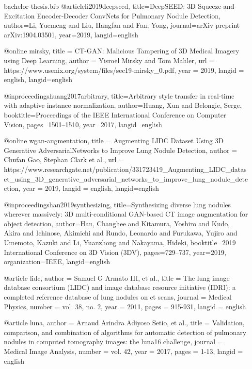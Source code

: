 
\begin{filecontents}{bachelor-thesis.bib}
@article{li2019deepseed,
  title={DeepSEED: 3D Squeeze-and-Excitation Encoder-Decoder ConvNets for Pulmonary Nodule Detection},
  author={Li, Yuemeng and Liu, Hangfan and Fan, Yong},
  journal={arXiv preprint arXiv:1904.03501},
  year={2019},
  langid={english}
}

@online{ mirsky,
    title       = {CT-GAN: Malicious Tampering of 3D Medical Imagery using Deep Learning},
    author      = {Yisroel Mirsky and Tom Mahler},
    url         = {https://www.usenix.org/system/files/sec19-mirsky_0.pdf},
    year        = {2019},
    langid      = {english},
    langid={english}
}

@inproceedings{huang2017arbitrary,
  title={Arbitrary style transfer in real-time with adaptive instance normalization},
  author={Huang, Xun and Belongie, Serge},
  booktitle={Proceedings of the IEEE International Conference on Computer Vision},
  pages={1501--1510},
  year={2017},
  langid={english}
}


@online{ wgan-augmentation,
    title       = {Augmenting LIDC Dataset Using 3D Generative AdversarialNetworks to Improve Lung Nodule Detection},
    author      = {Chufan Gao, Stephan Clark et al.},
    url         = {https://www.researchgate.net/publication/331723419_Augmenting_LIDC_dataset_using_3D_generative_adversarial_networks_to_improve_lung_nodule_detection},
    year        = {2019},
    langid      = {english},
    langid={english}
}

@inproceedings{han2019synthesizing,
  title={Synthesizing diverse lung nodules wherever massively: 3D multi-conditional GAN-based CT image augmentation for object detection},
  author={Han, Changhee and Kitamura, Yoshiro and Kudo, Akira and Ichinose, Akimichi and Rundo, Leonardo and Furukawa, Yujiro and Umemoto, Kazuki and Li, Yuanzhong and Nakayama, Hideki},
  booktitle={2019 International Conference on 3D Vision (3DV)},
  pages={729--737},
  year={2019},
  organization={IEEE},
  langid={english}
}


@article{ lidc,
    author      = {Samuel G Armato III, et al.},
    title       = {The lung image database consortium (LIDC) and image database resource initiative (IDRI): a completed reference database of lung nodules on ct scans},
    journal     = {Medical Physics},
    number      = {vol. 38, no. 2},
    year        = {2011},
    pages       = {915-931},
    langid      = {english}
}

@article{ luna,
    author      = {Arnaud Arindra Adiyoso Setio, et al.},
    title       = {Validation, comparison, and combination of algorithms for automatic detection of pulmonary nodules in computed tomography images: the luna16 challenge},
    journal     = {Medical Image Analysis},
    number      = {vol. 42},
    year        = {2017},
    pages       = {1-13},
    langid      = {english}
}


\end{filecontents}
